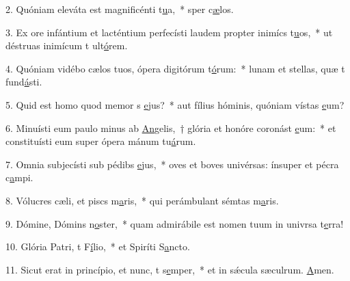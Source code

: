 2. Quóniam eleváta est magnificénti t\uline{u}a,~* sper c\uline{æ}los.\par 
3. Ex ore infántium et lacténtium perfecísti laudem propter inimícs t\uline{u}os,~* ut déstruas inimícum t ult\uline{ó}rem.\par 
4. Quóniam vidébo cælos tuos, ópera digitórum t\uline{ó}rum:~* lunam et stellas, quæ t fund\uline{á}sti.\par 
5. Quid est homo quod memor s \uline{e}jus?~* aut fílius hóminis, quóniam vístas \uline{e}um?\par 
6. Minuísti eum paulo minus ab \uline{An}gelis,~† glória et honóre coronást \uline{e}um:~* et constituísti eum super ópera mánum tu\uline{á}rum.\par 
7. Omnia subjecísti sub pédibs \uline{e}jus,~* oves et boves univérsas: ínsuper et pécra c\uline{a}mpi.\par 
8. Vólucres cæli, et piscs m\uline{a}ris,~* qui perámbulant sémtas m\uline{a}ris.\par 
9. Dómine, Dómins n\uline{o}ster,~* quam admirábile est nomen tuum in univrsa t\uline{e}rra!\par 
10. Glória Patri, t F\uline{í}lio,~* et Spiríti S\uline{a}ncto.\par 
11. Sicut erat in princípio, et nunc, t s\uline{e}mper,~* et in sǽcula sæculrum. \uline{A}men.\par 
